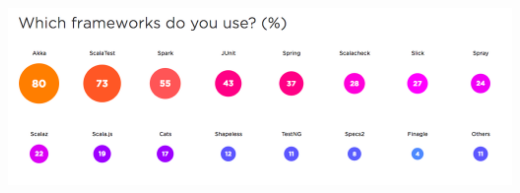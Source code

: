 \documentclass{beamer}
\begin{document}
\begin{frame}
    \includegraphics[width=\textwidth]{JetbrainsFrameworks.png}
\end{frame}
\end{document}
